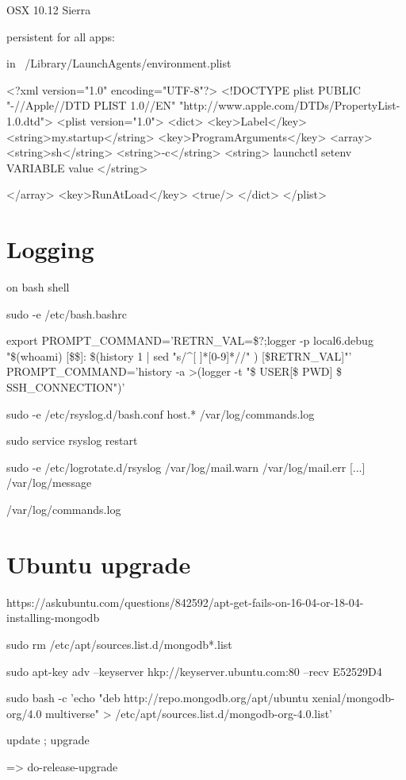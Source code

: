 OSX 10.12 Sierra

persistent for all apps: 

in ~/Library/LaunchAgents/environment.plist

<?xml version="1.0" encoding="UTF-8"?>
<!DOCTYPE plist PUBLIC "-//Apple//DTD PLIST 1.0//EN" "http://www.apple.com/DTDs/PropertyList-1.0.dtd">
<plist version="1.0">
<dict>
  <key>Label</key>
  <string>my.startup</string>
  <key>ProgramArguments</key>
  <array>
    <string>sh</string>
    <string>-c</string>
    <string>
    launchctl setenv VARIABLE value
  </string>

  </array>
  <key>RunAtLoad</key>
  <true/>
</dict>
</plist>




\section*{Logging}

on bash shell

sudo -e /etc/bash.bashrc

export PROMPT_COMMAND='RETRN_VAL=\$?;logger -p local6.debug "\$(whoami) [\$\$]: \$(history 1 | sed "s/^[ ]*[0-9]\+[ ]*//" ) [\$RETRN_VAL]"'
PROMPT_COMMAND='history -a >(logger -t "\$ USER[\$ PWD] \$ SSH_CONNECTION")'

sudo -e /etc/rsyslog.d/bash.conf
   host.*    /var/log/commands.log

sudo service rsyslog restart

sudo -e /etc/logrotate.d/rsyslog
/var/log/mail.warn
/var/log/mail.err
[...]
/var/log/message

/var/log/commands.log



\section*{Ubuntu upgrade}

https://askubuntu.com/questions/842592/apt-get-fails-on-16-04-or-18-04-installing-mongodb

sudo rm /etc/apt/sources.list.d/mongodb*.list

sudo apt-key adv --keyserver hkp://keyserver.ubuntu.com:80 --recv E52529D4

sudo bash -c 'echo "deb http://repo.mongodb.org/apt/ubuntu xenial/mongodb-org/4.0 multiverse" > /etc/apt/sources.list.d/mongodb-org-4.0.list'

update ; upgrade 

=> do-release-upgrade



